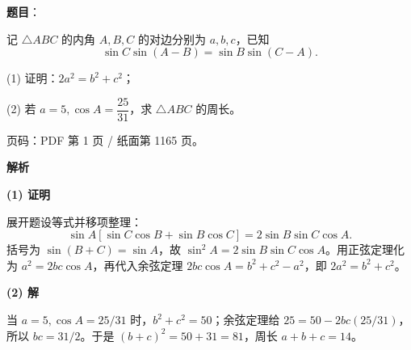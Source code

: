 \begin{answer}

\textbf{题目}：

记 $\triangle ABC$ 的内角 $A,B,C$ 的对边分别为 $a,b,c$，已知
\nopagebreak[4]
\[
\sin C\sin(A-B)=\sin B\sin(C-A).
\]

  (1) 证明：$2a^2=b^2+c^2$；

  (2) 若 $a=5,\cos A=\dfrac{25}{31}$，求 $\triangle ABC$ 的周长。

\begin{gktip}
页码：PDF 第 1 页 / 纸面第 1165 页。
\end{gktip}

\textbf{解析}

\textbf{(1) 证明}

展开题设等式并移项整理：
\nopagebreak[4]
\[
\sin A[\sin C\cos B+\sin B\cos C]=2\sin B\sin C\cos A.
\]
括号为 $\sin(B+C)=\sin A$，故 $\sin^2A=2\sin B\sin C\cos A$。用正弦定理化为 $a^2=2bc\cos A$，再代入余弦定理 $2bc\cos A=b^2+c^2-a^2$，即 $2a^2=b^2+c^2$。

\textbf{(2) 解}

当 $a=5,\cos A=25/31$ 时，$b^2+c^2=50$；余弦定理给 $25=50-2bc(25/31)$，所以 $bc=31/2$。于是 $(b+c)^2=50+31=81$，周长 $a+b+c=14$。



\end{answer}
